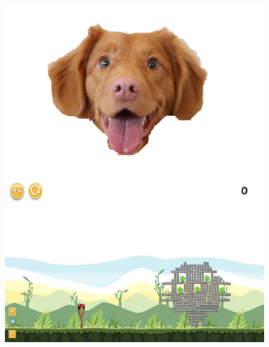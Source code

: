 \documentclass{dalthesis}
\begin{document}
\begin{figure}
  \includegraphics[width=\textwidth,height=\textheight,keepaspectratio]{levels/pictures/animals/dog.jpg}
  \includegraphics[width=\textwidth,height=\textheight,keepaspectratio]{levels/screenshots/animals/dog.png}
\end{figure}
\end{document}
